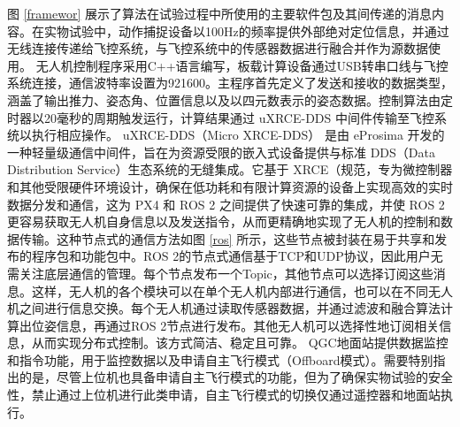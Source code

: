 \documentclass[lang=chs, degree=master, blindreview=true, winfonts=true]{yanputhesis}
\begin{document}
图 \ref{framewor} 展示了算法在试验过程中所使用的主要软件包及其间传递的消息内容。在实物试验中，动作捕捉设备以100Hz的频率提供外部绝对定位信息，并通过无线连接传递给飞控系统，与飞控系统中的传感器数据进行融合并作为源数据使用。
无人机控制程序采用C++语言编写，板载计算设备通过USB转串口线与飞控系统连接，通信波特率设置为921600。主程序首先定义了发送和接收的数据类型，涵盖了输出推力、姿态角、位置信息以及以四元数表示的姿态数据。控制算法由定时器以20毫秒的周期触发运行，计算结果通过 uXRCE-DDS 中间件传输至飞控系统以执行相应操作。
uXRCE-DDS（Micro XRCE-DDS） 是由 eProsima 开发的一种轻量级通信中间件，旨在为资源受限的嵌入式设备提供与标准 DDS（Data Distribution Service）生态系统的无缝集成。它基于 XRCE（规范，专为微控制器和其他受限硬件环境设计，确保在低功耗和有限计算资源的设备上实现高效的实时数据分发和通信，这为 PX4 和 ROS 2 之间提供了快速可靠的集成，并使 ROS 2 更容易获取无人机自身信息以及发送指令，从而更精确地实现了无人机的控制和数据传输。这种节点式的通信方法如图 \ref{ros} 所示，这些节点被封装在易于共享和发布的程序包和功能包中。ROS 2的节点式通信基于TCP和UDP协议，因此用户无需关注底层通信的管理。每个节点发布一个Topic，其他节点可以选择订阅这些消息。这样，无人机的各个模块可以在单个无人机内部进行通信，也可以在不同无人机之间进行信息交换。每个无人机通过读取传感器数据，并通过滤波和融合算法计算出位姿信息，再通过ROS 2节点进行发布。其他无人机可以选择性地订阅相关信息，从而实现分布式控制。该方式简洁、稳定且可靠。
QGC地面站提供数据监控和指令功能，用于监控数据以及申请自主飞行模式（Offboard模式）。需要特别指出的是，尽管上位机也具备申请自主飞行模式的功能，但为了确保实物试验的安全性，禁止通过上位机进行此类申请，自主飞行模式的切换仅通过遥控器和地面站执行。
\end{document}
